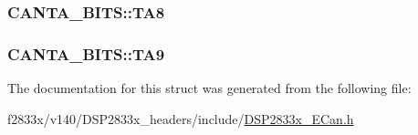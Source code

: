 \subsubsection[{T\+A8}]{ C\+A\+N\+T\+A\+\_\+\+B\+I\+T\+S\+::\+T\+A8}\label{struct_c_a_n_t_a___b_i_t_s_a641644e7cf8ba06ad8510815de9145b4}
\hypertarget{struct_c_a_n_t_a___b_i_t_s_a24ed441fd09468c67b640de4c5b25061}{}
\subsubsection[{T\+A9}]{ C\+A\+N\+T\+A\+\_\+\+B\+I\+T\+S\+::\+T\+A9}\label{struct_c_a_n_t_a___b_i_t_s_a24ed441fd09468c67b640de4c5b25061}


The documentation for this struct was generated from the following file\+:\begin{DoxyCompactItemize}
\item 
f2833x/v140/\+D\+S\+P2833x\+\_\+headers/include/\hyperlink{_d_s_p2833x___e_can_8h}{D\+S\+P2833x\+\_\+\+E\+Can.\+h}\end{DoxyCompactItemize}
